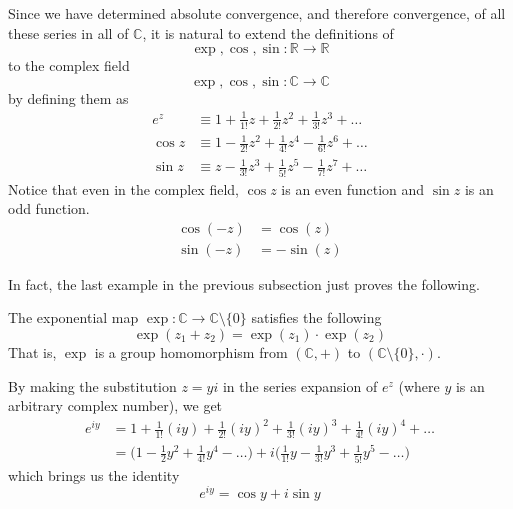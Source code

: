       \begin{definition}
        Since we have determined absolute convergence, and therefore convergence, of all these series in all of $\mathbb{C}$, it is natural to extend the definitions of 
        \[\exp, \cos, \sin: \mathbb{R} \longrightarrow \mathbb{R}\]
        to the complex field 
        \[\exp, \cos, \sin: \mathbb{C} \longrightarrow \mathbb{C}\]
        by defining them as 
        \begin{align*}
            e^z & \equiv 1 + \frac{1}{1!}z + \frac{1}{2!} z^2 + \frac{1}{3!} z^3 + \ldots \\
            \cos{z} & \equiv 1 - \frac{1}{2!} z^2 + \frac{1}{4!} z^4 - \frac{1}{6!} z^6 + \ldots \\
            \sin{z} & \equiv z - \frac{1}{3!} z^3 + \frac{1}{5!} z^5 - \frac{1}{7!} z^7 + \ldots
        \end{align*}
        Notice that even in the complex field, $\cos{z}$ is an even function and $\sin{z}$ is an odd function. 
        \begin{align*}
            \cos(-z) & = \cos(z) \\
            \sin(-z) & = -\sin(z)
        \end{align*}
      \end{definition}

      In fact, the last example in the previous subsection just proves the following. 

      \begin{lemma}
        The exponential map $\exp: \mathbb{C} \longrightarrow \mathbb{C}\setminus \{0\}$ satisfies the following
        \[\exp(z_1 + z_2) = \exp(z_1) \cdot \exp (z_2)\]
        That is, $\exp$ is a group homomorphism from $(\mathbb{C}, +)$ to $(\mathbb{C} \setminus \{0\}, \cdot)$. 
      \end{lemma}

      \begin{definition}
        By making the substitution $z = yi$ in the series expansion of $e^z$ (where $y$ is an arbitrary complex number), we get 
        \begin{align*}
            e^{iy} & = 1 + \frac{1}{1!} (iy) + \frac{1}{2!}(iy)^2 + \frac{1}{3!} (iy)^3 + \frac{1}{4!} (iy)^4 + \ldots \\
            & = \bigg(1 - \frac{1}{2} y^2 + \frac{1}{4!} y^4 - \ldots \bigg) + i \bigg(\frac{1}{1!} y - \frac{1}{3!} y^3 + \frac{1}{5!} y^5 - \ldots \bigg)
        \end{align*}
        which brings us the identity
        \[e^{iy} = \cos{y} + i \sin{y}\]
      \end{definition}


